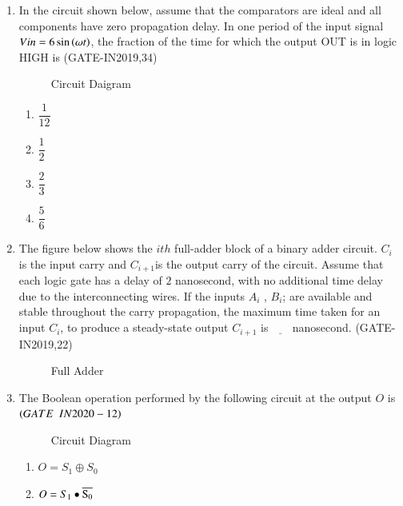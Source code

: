 \begin{enumerate}
\item In the circuit shown below, assume that the comparators are ideal and all components have zero propagation delay. In one period of the input signal $Vin=6\sin\left(\omega t\right)$, the fraction of the time for which the output OUT is in logic HIGH is 
		                 \hfill(GATE-IN2019,34)
\begin{figure}[H]
\centering
    
	    \caption{Circuit Daigram}
     \end{figure}
\begin{enumerate}
	\item $\dfrac{1}{12}$
	\item $\dfrac{1}{2}$
	\item $\dfrac{2}{3}$
	\item $\dfrac{5}{6}$
\end{enumerate}


\item The figure below shows the $ith$ full-adder block of a binary adder circuit. $C_i$ is the input carry and $C_{i+1}$is the output carry of the circuit. Assume that each logic gate has a delay of $2$ nanosecond, with no additional time delay due to the interconnecting wires. If the inputs $A_i$ , $B_i$; are available and stable throughout the carry propagation, the maximum time taken for an input $C_i$, to produce a steady-state output $C_{i+1}$ is $\underline{\hspace{18pt}}$ nanosecond.
	               \hfill(GATE-IN2019,22)
\begin{figure}[H] 
    \centering
	
	\caption{Full Adder}
\end{figure}
\item The Boolean operation performed by the following  circuit at the output $O$ is \underline{\hspace{2cm}}
    $\hfill\brak{GATE \enspace IN2020-12}$

\begin{figure}[H]

\caption{Circuit Diagram}
\label{fig:figure13}
\end{figure}

\begin{enumerate}

            \item  $O=S_1\oplus S_0$ 
            
            \item  $O=S_1\bullet\overline{\rm S_0}$
            

\end{enumerate}
\end{enumerate}
